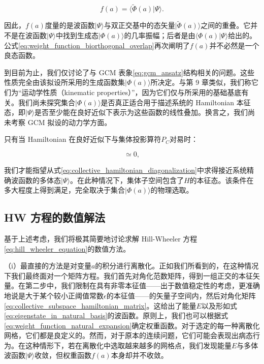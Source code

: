 \begin{equation}
f(a)=\langle\tilde{\Phi}(a)|\Psi\rangle.\label{eq:weight_function_biorthogonal_overlap}
\end{equation}

因此，$f(a)$度量的是波函数$|\Psi\rangle$与双正交基中的态矢量$|\tilde{\Phi}(a)\rangle$之间的重叠。它并不是在波函数$|\Psi\rangle$中找到生成态$|\Phi(a)\rangle$的几率振幅；后者是由$\langle\Phi(a)|\Psi\rangle$给出的。公式\ref{eq:weight_function_biorthogonal_overlap}再次阐明了$f(a)$并不必然是一个良态函数。

到目前为止，我们仅讨论了与 GCM 表象\ref{eq:gcm_ansatz}结构相关的问题。这些性质完全由该拟设所采用的生成函数集$|\Phi(a)\rangle$所决定。与第
9 章类似，我们称它们为``运动学性质（kinematic properties）''，因为它们仅与所采用的基础基底有关。我们尚未探究集合$|\Phi(a)\rangle$是否真正适合用于描述系统的
Hamiltonian 本征态，即$|\Psi\rangle$是否至少能在良好近似下表示为这些函数的线性叠加。换言之，我们尚未考察
GCM 拟设的动力学方面。

只有当 Hamiltonian 在良好近似下与集体投影算符$P_{C}$对易时：

\begin{equation}
[H,P_{C}]\simeq0,\label{eq:hamiltonian_collective_projection_commutation}
\end{equation}

我们才能指望从式\ref{eq:collective_hamiltonian_diagonalization}中求得接近系统精确波函数的多体态$|\Psi\rangle$。在此种情况下，集体子空间包含了$H$的本征态。该条件在多大程度上得到满足，完全取决于集合$|\Phi(a)\rangle$的物理选取。

\subsection{HW 方程的数值解法}

基于上述考虑，我们将极其简要地讨论求解 Hill-Wheeler 方程\ref{eq:hill_wheeler_equation}的数值方法。

（i）最直接的方法是对变量$a$的积分进行离散化。正如我们所看到的，在这种情况下我们最终面对一个矩阵方程。我们首先对角化范数矩阵，得到一组正交的本征矢量。在第二步中，我们限制在具有非零本征值——出于数值稳定性的考虑，更准确地说是大于某个较小正阈值常数$\epsilon$的本征值——的矢量子空间内，然后对角化矩阵\ref{eq:collective_subspace_hamiltonian_matrix}。这给出了能量$E$以及形如式\ref{eq:eigenstate_in_natural_basis}的波函数。原则上，我们也可以根据式\ref{eq:weight_function_natural_expansion}确定权重函数。对于选定的每一种离散化网格，它们都是良定义的。然而，对于原本的连续问题，它们可能会表现出病态行为。在这种情形下，若在离散化中选取越来越多的网格点，我们发现能量$E$与多体波函数$|\Psi\rangle$收敛，但权重函数$f(a)$本身却并不收敛。

